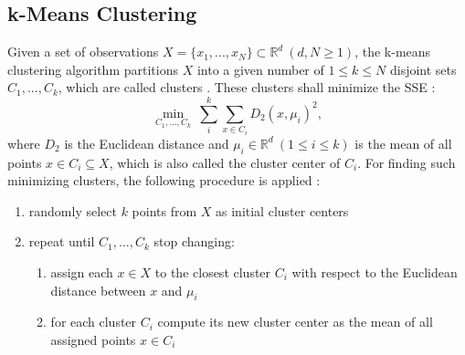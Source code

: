 \subsection{k-Means Clustering}
Given a set of observations $X = \{x_1, ..., x_N\} \subset \mathbb{R}^d \ (d, N \geq 1)$, the k-means clustering algorithm partitions $X$ into a given number of $1 \leq k \leq N$ disjoint sets $C_1, ..., C_k$, which are called clusters \cite{K_Means_Explanation}. These clusters shall minimize the \ac{SSE} \cite{K_Means_Explanation}:
\begin{equation}
\min_{C_1, ..., C_k} \ \sum_{i}^{k}\sum_{x \in C_i}D_2(x,\mu_i)^2,
\label{eq:objective_k_means}
\end{equation}
where $D_2$ is the Euclidean distance and $\mu_i \in \mathbb{R}^d \ (1 \leq i \leq k)$ is the mean of all points $x \in C_i \subseteq X$, which is also called the cluster center of $C_i$. For finding such minimizing clusters, the following procedure is applied \cite{K_Means_Explanation}:
\begin{enumerate}[label=\arabic*., ref=\arabic*, itemsep=0pt,parsep=5pt]
    \item randomly select $k$ points from $X$ as initial cluster centers
    \item repeat until $C_1, ..., C_k$ stop changing:
    \begin{enumerate}[label*=\arabic*, ref=\theenumi.\arabic*]
        \item assign each $x \in X$ to the closest cluster $C_i$ with respect to the Euclidean distance between $x$ and $\mu_i$
        \item for each cluster $C_i$ compute its new cluster center as the mean of all assigned points $x \in C_i$
    \end{enumerate}
\end{enumerate}
